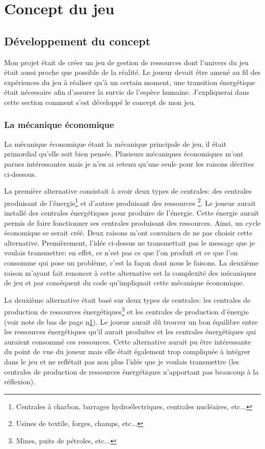 \documentclass{article}
\begin{document}
        \section{Concept du jeu}
        \subsection{Développement du concept}
        
        Mon projet était de créer un jeu de gestion de ressources dont l'univers du jeu était aussi proche que possible de la réalité. Le joueur devait être amené au fil des expériences du jeu à réaliser qu'à un certain moment, une transition énergétique était nécessaire afin d'assurer la survie de l'espèce humaine. J'expliquerai dans cette section comment s'est développé le concept de mon jeu.
        
        \subsubsection{La mécanique économique}
        La mécanique économique étant la mécanique principale de jeu, il était primordial qu'elle soit bien pensée.
        Plusieurs mécaniques économiques m'ont parues intéressantes mais je n'en ai retenu qu'une seule pour les raisons décrites ci-dessous.
        
        
        La première alternative consistait à avoir deux types de centrales: des centrales produisant de l'énergie\footnote{Centrales à charbon, barrages hydroélectriques, centrales nucléaires, etc...\label{energyPlant}} et d'autres produisant des ressources \footnote{Usines de textile, forges, champs, etc...}. Le joueur aurait installé des centrales énergétiques pour produire de l'énergie. Cette énergie aurait permis de faire fonctionner ses centrales produisant des ressources. Ainsi, un cycle économique se serait créé. 
        Deux raisons m'ont convaincu de ne pas choisir cette alternative. Premièrement, l'idée ci-dessus ne transmettait pas le message que je voulais transmettre: en effet, ce n'est pas ce que l'on produit et ce que l'on consomme qui pose un problème, c'est la façon dont nous le faisons. La deuxième raison m'ayant fait renoncer à cette alternative est la complexité des mécaniques de jeu et par conséquent du code qu'impliquait cette mécanique économique.
        
        
        La deuxième alternative était basé sur deux types de centrales: les centrales de production de ressources énergétiques\footnote{Mines, puits de pétroles, etc...} et les centrales de production d'énergie (voir note de bas de page n\degree\ref{energyPlant}). Le joueur aurait dû trouver un bon équilibre entre les ressources énergétiques qu'il aurait produites et les centrales énergétiques qui auraient consommé ces ressources.
        Cette alternative aurait pu être intéressante du point de vue du joueur mais elle était également trop compliquée à intégrer dans le jeu et ne reflétait pas non plus l'idée que je voulais transmettre (les centrales de production de ressources énergétiques n'apportant pas beaucoup à la réflexion).
        
\end{document}
